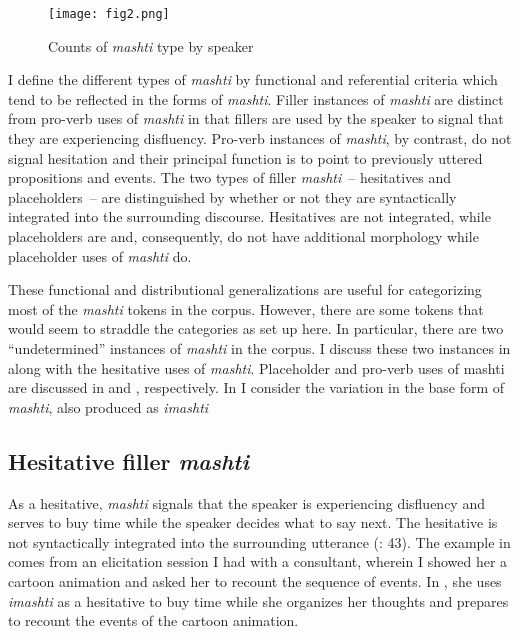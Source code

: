 \documentclass[output=paper]{langscibook}
\begin{document}
  
\begin{figure}
\texttt{[image: fig2.png]}
\caption{\label{fig:rice:2} Counts of \textit{mashti} type by speaker}
\end{figure}


I define the different types of \textit{mashti} by functional and referential criteria which tend to be reflected in the forms of \textit{mashti}. Filler instances of \textit{mashti} are distinct from pro-verb uses of \textit{mashti} in that fillers are used by the speaker to signal that they are experiencing disfluency. Pro-verb instances of \textit{mashti}, by contrast, do not signal hesitation and their principal function is to point to previously uttered propositions and events. The two types of filler \textit{mashti}~-- hesitatives and placeholders~-- are distinguished by whether or not they are syntactically integrated into the surrounding discourse. Hesitatives are not integrated, while placeholders are and, consequently, do not have additional morphology while placeholder uses of \textit{mashti} do. 

These functional and distributional generalizations are useful for categorizing most of the \textit{mashti} tokens in the corpus. However, there are some tokens that would seem to straddle the categories as set up here. In particular, there are two “undetermined” instances of \textit{mashti} in the corpus. I discuss these two instances in  along with the hesitative uses of \textit{mashti}. Placeholder and pro-verb uses of mashti are discussed in  and , respectively. In  I consider the variation in the base form of \textit{mashti}, also produced as \textit{imashti}

\subsection{Hesitative filler \textit{mashti}}
\label{sec:rice:3.1}
As a hesitative, \textit{mashti} signals that the speaker is experiencing disfluency and serves to buy time while the speaker decides what to say next. The hesitative is not syntactically integrated into the surrounding utterance (\citealt{Hayashi2010}: 43). The example in  comes from an elicitation session I had with a consultant, wherein I showed her a cartoon animation and asked her to recount the sequence of events. In , she uses \textit{imashti} as a hesitative to buy time while she organizes her thoughts and prepares to recount the events of the cartoon animation. 
\end{document}
